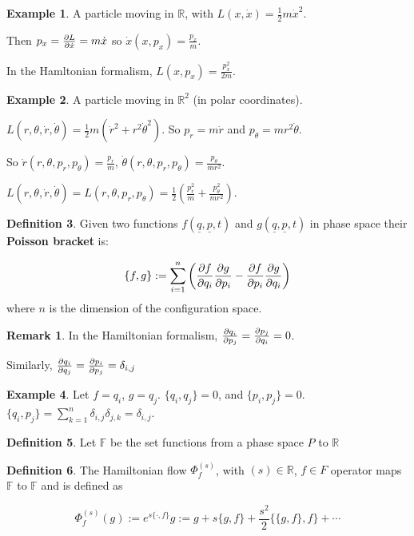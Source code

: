 \documentclass[12pt,a4paper]{article}
\theoremstyle{definition}
\newtheorem{definition}{Definition}[subsection]
\newtheorem{example}[definition]{Example}
\newtheorem*{remark}{Remark}
\begin{document}
\begin{example}
	A particle moving in $\mathbb{R}$, with $L(x, \dot{x}) = \frac{1}{2} m \dot{x}^2$.

	Then $p_x = \diffp{L}{\dot{x}} = m \dot{x}$ so $\dot{x}(x, p_x) = \frac{p_x}{m}$.

	In the Hamltonian formalism, $L(x, p_x) = \frac{p_x^2}{2m}$.
\end{example}

\begin{example}
	A particle moving in $\mathbb{R}^2$ (in polar coordinates).

	$L(r, \theta, \dot{r}, \dot{\theta}) = \frac{1}{2} m (\dot{r}^2 + r^2 \dot{\theta}^2)$. So $p_r = m\dot{r}$ and $p_{\theta} = m r^2 \dot{\theta}$.

	So $\dot{r}(r, \theta, p_r, p_{\theta}) = \frac{p_r}{m}$, $\dot{\theta}(r, \theta, p_r, p_{\theta}) = \frac{p_{\theta}}{m r^2}$.

	$L(r, \theta, \dot{r}, \dot{\theta}) = L(r, \theta, p_r, p_{\theta}) = \frac{1}{2} (\frac{p_r^2}{m} + \frac{p_{\theta}^2}{m r^2})$.
\end{example}

\begin{definition}
	Given two functions $f(\underline{q}, \underline{p}, t)$ and $g(\underline{q}, \underline{p}, t)$ in phase space their \textbf{Poisson bracket} is:

	\[ \{f, g\} := \sum_{i = 1}^n \left( \diffp{f}{q_i} \diffp{g}{p_i} - \diffp{f}{p_i} \diffp{g}{q_i} \right)\] where $n$ is the dimension of the configuration space.
\end{definition}

\begin{remark}
	In the Hamiltonian formalism, $\diffp{q_i}{p_j} = \diffp{p_j}{q_i} = 0$.

	Similarly, $\diffp{q_i}{q_j} = \diffp{p_i}{p_j} = \delta_{i, j}$
\end{remark}

\begin{example}
	Let $f = q_i$, $g = q_j$. $\{q_i, q_j\} = 0$, and $\{p_i, p_j\} = 0$. $\{q_i, p_j\} = \sum_{k = 1}^n \delta_{i, j} \delta_{j, k} = \delta_{i, j}$.
\end{example}

\begin{definition}
	Let $\mathbb{F}$ be the set functions from a phase space $P$ to $\mathbb{R}$
\end{definition}

\begin{definition}
	The Hamiltonian flow $\Phi_f^{(s)}$, with $(s) \in \mathbb{R}$, $f \in F$ operator maps $\mathbb{F}$ to $\mathbb{F}$ and is defined as

	\[ \Phi_f^{(s)} (g) := e^{s \{\cdot, f\}} g := g + s \{g, f\} + \frac{s^2}{2} \{ \{g, f\}, f\} + \cdots \]
\end{definition}
\end{document}
